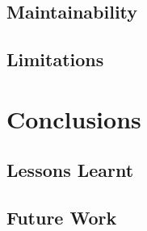\documentclass[authoryearcitations]{UoYCSproject}
\begin{document}
\section{Maintainability}

\section{Limitations}

\chapter{Conclusions}

\section{Lessons Learnt}

\section{Future Work}



\end{document}
